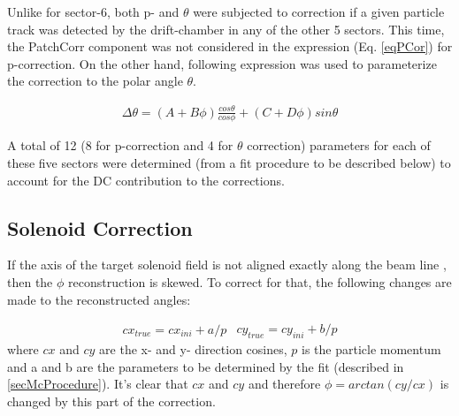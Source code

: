 Unlike for sector-6, both p- and $\theta$ were subjected to correction if a given particle track was detected by the drift-chamber in any of the other 5 sectors. This time, the PatchCorr component was not considered in the expression (Eq. \ref{eqPCor}) for p-correction. On the other hand, following expression was used to parameterize the correction to the polar angle $\theta$.

\begin{eqnarray}
\label{eqThCor}
\Delta\theta = (A+B\phi)\frac{cos\theta}{cos\phi} + (C+D\phi)sin\theta
\end{eqnarray}

A total of 12 (8 for p-correction and 4 for $\theta$ correction) parameters for each of these five sectors were determined (from a fit procedure to be described below) to account for the DC contribution to the corrections. 









\subsection{Solenoid Correction} 

If the axis of the target solenoid field is not aligned exactly along the beam line%
, then the $\phi$ reconstruction is skewed. To correct for that, the following changes %
are made to the reconstructed angles: 

\begin{subequations}
\label{eqTiltCor}
\begin{eqnarray}
\label{eqTiltCor1}
cx_{true} = cx_{ini} + a/p %
\end{eqnarray}

\begin{eqnarray}
\label{eqTiltCor2}
cy_{true} = cy_{ini} + b/p
\end{eqnarray}
\end{subequations}
where $cx$ and $cy$ are the x- and y- direction cosines, $p$ is the particle momentum and a and b are the parameters to be determined by the fit (described in \ref{secMcProcedure}). %
It's clear that $cx$ and $cy$ and therefore $\phi = arctan(cy/cx)$ %
is changed by this part of the correction.





